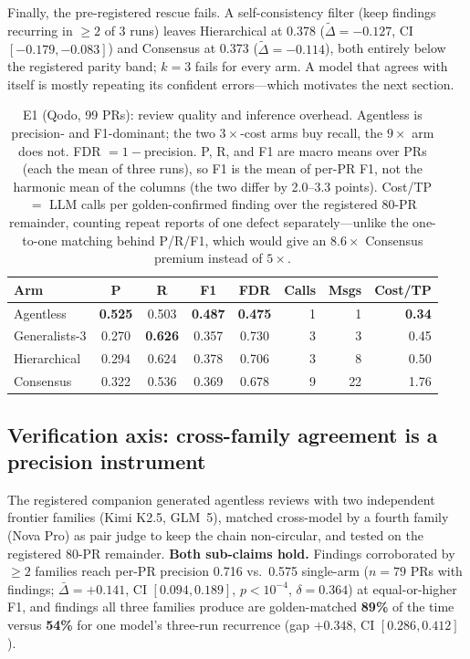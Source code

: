 \documentclass[conference]{IEEEtran}
\begin{document}
Finally, the pre-registered rescue fails. A self-consistency filter (keep
findings recurring in ${\geq}2$ of 3 runs) leaves Hierarchical at 0.378
($\tilde\Delta{=}{-}0.127$, CI $[-0.179,-0.083]$) and Consensus at 0.373
($\tilde\Delta{=}{-}0.114$), both entirely below the registered parity band;
$k{=}3$ fails for every arm. A model that agrees with itself is mostly repeating
its confident errors---which motivates the next section.

\begin{table}[t]
\caption{E1 (Qodo, 99 PRs): review quality and inference overhead. Agentless is
precision- and F1-dominant; the two $3\times$-cost arms buy recall, the
$9\times$ arm does not. FDR $=1-$precision. P, R, and F1 are macro means over
PRs (each the mean of three runs), so F1 is the mean of per-PR F1, not the
harmonic mean of the columns (the two differ by 2.0--3.3 points). Cost/TP $=$
LLM calls per golden-confirmed finding over the registered 80-PR remainder,
counting repeat reports of one defect separately---unlike the one-to-one
matching behind P/R/F1, which would give an $8.6\times$ Consensus premium
instead of $5\times$.}
\label{tab:confirmatory}
\centering
\footnotesize
\begin{tabular}{@{}lccccrrr@{}}
\toprule
\textbf{Arm} & \textbf{P} & \textbf{R} & \textbf{F1} & \textbf{FDR} & \textbf{Calls} & \textbf{Msgs} & \textbf{Cost/TP} \\
\midrule
Agentless      & \textbf{0.525} & 0.503 & \textbf{0.487} & \textbf{0.475} & 1 & 1  & \textbf{0.34} \\
Generalists-3  & 0.270 & \textbf{0.626} & 0.357 & 0.730 & 3 & 3  & 0.45 \\
Hierarchical   & 0.294 & 0.624 & 0.378 & 0.706 & 3 & 8  & 0.50 \\
Consensus      & 0.322 & 0.536 & 0.369 & 0.678 & 9 & 22 & 1.76 \\
\bottomrule
\end{tabular}
\end{table}

\subsection{Verification axis: cross-family agreement is a precision instrument}
\label{sec:hetero}
The registered companion generated agentless reviews with two independent
frontier families (Kimi K2.5, GLM~5), matched cross-model by a fourth family
(Nova Pro) as pair judge to keep the chain non-circular, and tested on the
registered 80-PR remainder. \textbf{Both sub-claims hold.} Findings corroborated
by ${\geq}2$ families reach per-PR precision 0.716 vs.\ 0.575 single-arm
($n{=}79$ PRs with findings; $\bar\Delta{=}{+}0.141$, CI $[0.094,0.189]$,
$p{<}10^{-4}$, $\delta{=}0.364$) at
equal-or-higher F1, and findings all three families produce are golden-matched
\textbf{89\%} of the time versus \textbf{54\%} for one model's three-run
recurrence (gap ${+}0.348$, CI $[0.286,0.412]$).
\end{document}
